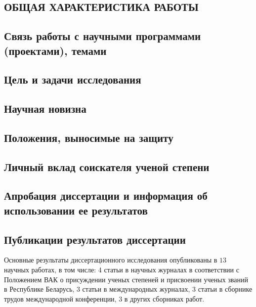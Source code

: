 \documentclass[_00_dissertation.tex]{subfiles}
\begin{document}
\onlyinsubfile{
    \renewcommand{\contentsname}{ОГЛАВЛЕНИЕ}
    \setcounter{tocdepth}{3}
    \tableofcontents
}


\begin{center}
    \chapter*{ОБЩАЯ ХАРАКТЕРИСТИКА РАБОТЫ}
\end{center}

\section*{Связь работы с научными программами (проектами), темами}

\section*{Цель и задачи исследования}

\section*{Научная новизна}

\section*{Положения, выносимые на защиту}

\section*{Личный вклад соискателя ученой степени}

\section*{Апробация диссертации и информация об использовании ее результатов}

\section*{Публикации результатов диссертации}

Основные результаты диссертационного исследования опубликованы в $13$ научных работах, в том числе: 4 статьи в научных журналах в соответствии с Положением ВАК о присуждении ученых степеней и присвоении ученых званий в Республике Беларусь, 3 статьи в международных журналах, 3 статьи в сборнике трудов международной конференции, 3 в других сборниках работ.
\end{document}
